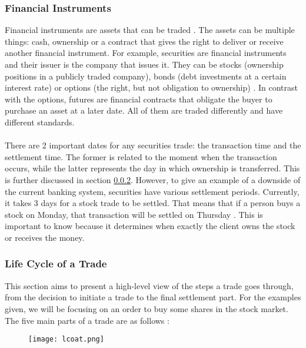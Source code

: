 \documentclass[12pt,twoside]{article}
\begin{document}
\subsubsection{Financial Instruments}
\label{sub:FinancialInstruments}
Financial instruments are assets that can be traded \cite{FA}. The assets can be multiple things: cash, ownership or a contract that gives the right to deliver or receive another financial instrument. For example, securities are financial instruments and their issuer is the company that issues it. They can be stocks (ownership positions in a publicly traded company), bonds (debt investments at a certain interest rate) or options (the right, but not obligation to ownership) \cite{Security}. In contrast with the options, futures are financial contracts that obligate the buyer to purchase an asset at a later date. All of them are traded differently and have different standards. 
\\ \\
There are 2 important dates for any securities trade: the transaction time and the settlement time. The former is related to the moment when the transaction occurs, while the latter represents the day in which ownership is transferred. This is further discussed in section \ref{sub:LCOAT}. However, to give an example of a downside of the current banking system, securities have various settlement periods. Currently, it takes 3 days for a stock trade to be settled. That means that if a person buys a stock on Monday, that transaction will be settled on Thursday \cite{TTimes}. This is important to know because it determines when exactly the client owns the stock or receives the money.
\subsubsection{Life Cycle of a Trade}
\label{sub:LCOAT}
This section aims to present a high-level view of the steps a trade goes through, from the decision to initiate a trade to the final settlement part. For the examples given, we will be focusing on an order to buy some shares in the stock market. The five main parts of a trade are as follows \cite{TradeCycle}:

\begin{figure}[H]
\centering
\texttt{[image: lcoat.png]}
\centering
\label{fig:scheme}
\end{figure}
\end{document}
